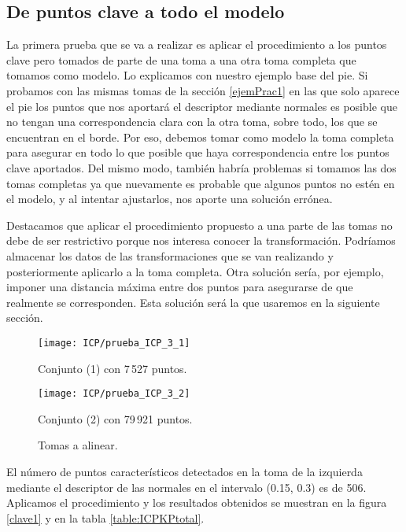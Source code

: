 \subsection{De puntos clave a todo el modelo}
La primera prueba que se va a realizar es aplicar el procedimiento a los puntos clave pero tomados de parte de una toma a una otra toma completa que tomamos como modelo. Lo explicamos con nuestro ejemplo base del pie. Si probamos con las mismas tomas de la sección \ref{ejemPrac1} en las que solo aparece el pie los puntos que nos aportará el descriptor mediante normales es posible que no tengan una correspondencia clara con la otra toma, sobre todo, los que se encuentran en el borde. Por eso, debemos tomar como modelo la toma completa para asegurar en todo lo que posible que haya correspondencia entre los puntos clave aportados. Del mismo modo, también habría problemas si tomamos las dos tomas completas ya que nuevamente es probable que algunos puntos no estén en el modelo, y al intentar ajustarlos, nos aporte una solución errónea. \begin{comment}
Sección sola de aproximaciones erróneas
\end{comment} 
Destacamos que aplicar el procedimiento propuesto a una parte de las tomas no debe de ser restrictivo porque nos interesa conocer la transformación. Podríamos almacenar los datos de las transformaciones que se van realizando y posteriormente aplicarlo a la toma completa. Otra solución sería, por ejemplo, imponer una distancia máxima entre dos puntos para asegurarse de que realmente se corresponden. Esta solución será la que usaremos en la siguiente sección.\\

\begin{figure}[h!]

	\begin{minipage}[b]{0.5\textwidth}
		\centering
		\texttt{[image: ICP/prueba\_ICP\_3\_1]} 
		\caption*{Conjunto (1) con  7\,527 puntos.}
	\end{minipage}
	\begin{minipage}[b]{0.5\textwidth}
		\centering
		\texttt{[image: ICP/prueba\_ICP\_3\_2]}
		\caption*{Conjunto (2) con 79\,921 puntos.}
	\end{minipage}
	
	\caption{Tomas a alinear.}
\end{figure}

El número de puntos característicos detectados en la toma de la izquierda mediante el descriptor de las normales en el intervalo (0.15, 0.3) es de 506. Aplicamos el procedimiento y los resultados obtenidos se muestran en la figura \ref{clave1} y en la tabla \ref{table:ICPKPtotal}.\\


